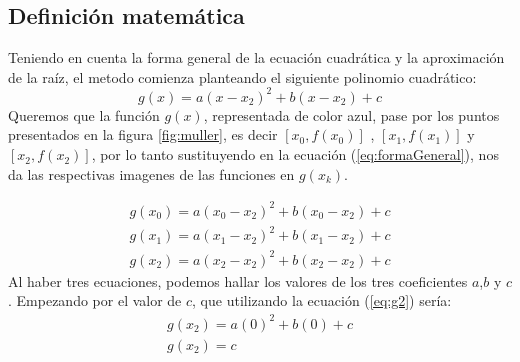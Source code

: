 \documentclass[fleqn,10pt]{SelfArx}
\begin{document}
\subsection{Definición matemática}

Teniendo en cuenta la forma general de la ecuación cuadrática y la aproximación de la raíz,
el metodo comienza planteando el siguiente polinomio cuadrático:
\begin{equation} \label{eq:formaGeneral}
	g(x)=a(x-x_{2})^2+b(x-x_{2})+c
\end{equation}
Queremos que la función $g(x)$, representada de color azul, pase por los puntos presentados en la figura \ref*{fig:muller},
 es decir $[x_{0},f(x_{0})]$ , $[x_{1},f(x_{1})]$ y $[x_{2},f(x_{2})]$, por lo tanto sustituyendo en la ecuación (\ref*{eq:formaGeneral}),
 nos da las respectivas imagenes de las funciones en $g(x_{k})$.

\begin{equation} \label{eq:g0}
\begin{aligned}
	g(x_{0})=a(x_{0}-x_{2})^2+b(x_{0}-x_{2})+c
\end{aligned}
\end{equation}
\begin{equation} \label{eq:g1}
\begin{aligned}
	g(x_{1})=a(x_{1}-x_{2})^2+b(x_{1}-x_{2})+c
\end{aligned}
\end{equation}
\begin{equation} \label{eq:g2}
\begin{aligned}
	g(x_{2})=a(x_{2}-x_{2})^2+b(x_{2}-x_{2})+c
\end{aligned}
\end{equation}
Al haber tres ecuaciones, podemos hallar los valores de los tres coeficientes $a$,$b$ y $c$.
Empezando por el valor de $c$, que utilizando la ecuación (\ref*{eq:g2}) sería:
\begin{equation} \label{eq:g2S}
	\begin{aligned}
	g(x_{2})=a(0)^2+b(0)+c\\
	g(x_{2})=c
\end{aligned}
\end{equation}

\end{document}
